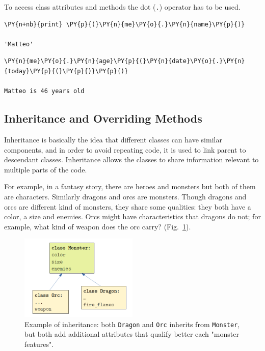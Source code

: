 To access class attributes and methods the dot (\texttt{.}) operator has to be used.

\begin{codebox}[breakable, size=fbox, boxrule=1pt, pad at break*=1mm,colback=cellbackground, colframe=cellborder]
\begin{Verbatim}[commandchars=\\\{\}]
\PY{n+nb}{print} \PY{p}{(}\PY{n}{me}\PY{o}{.}\PY{n}{name}\PY{p}{)}

'Matteo'
\end{Verbatim}
\end{codebox}
        
\begin{codebox}[breakable, size=fbox, boxrule=1pt, pad at break*=1mm,colback=cellbackground, colframe=cellborder]
\begin{Verbatim}[commandchars=\\\{\}]
\PY{n}{me}\PY{o}{.}\PY{n}{age}\PY{p}{(}\PY{n}{date}\PY{o}{.}\PY{n}{today}\PY{p}{(}\PY{p}{)}\PY{p}{)}

Matteo is 46 years old
\end{Verbatim}
\end{codebox}

\subsection{Inheritance and Overriding Methods}\label{inheritance-and-overriding-methods}

Inheritance is basically the idea that different classes can have
similar components, and in order to avoid repeating code, it is
used to link parent to descendant classes. Inheritance allows the classes to 
share information relevant to multiple parts of the code.

For example, in a fantasy story, there are heroes and monsters but both of them are characters. 
Similarly dragons and orcs are monsters. Though dragons and orcs are different kind of monsters, 
they share some qualities: they both have a color, a size and enemies. Orcs
might have characteristics that dragons do not; for example, what kind
of weapon does the orc carry? (Fig.~\ref{fig:inheritance}). 

\begin{figure}[h]
  \centering
  \includegraphics[width=0.5\textwidth]{figures/inheritance.png}
  \caption{Example of inheritance: both \texttt{Dragon} and \texttt{Orc} inherits from \texttt{Monster}, but both add additional attributes that qualify better each "monster features".}
  \label{fig:inheritance}
\end{figure}

